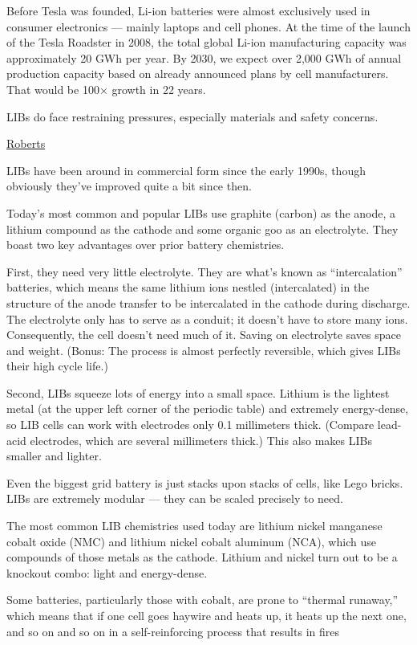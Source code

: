 \documentclass[
]{book}
\begin{document}
Before Tesla was founded, Li-ion batteries were almost exclusively used in consumer electronics --- mainly laptops and cell phones. At the time of the launch of the Tesla Roadster in 2008, the total global Li-ion manufacturing capacity was approximately 20 GWh per year. By 2030, we expect over 2,000 GWh of annual production capacity based on already announced plans by cell manufacturers.
That would be 100× growth in 22 years.

LIBs do face restraining pressures, especially materials and safety concerns.

\href{https://www.canarymedia.com/articles/why-lithium-ion-batteries-are-so-important/}{Roberts}

LIBs have been around in commercial form since the early 1990s, though obviously they've improved quite a bit since then.

Today's most common and popular LIBs use graphite (carbon) as the anode, a lithium compound as the cathode and some organic goo as an electrolyte. They boast two key advantages over prior battery chemistries.

First, they need very little electrolyte. They are what's known as ``intercalation'' batteries, which means the same lithium ions nestled (intercalated) in the structure of the anode transfer to be intercalated in the cathode during discharge. The electrolyte only has to serve as a conduit; it doesn't have to store many ions. Consequently, the cell doesn't need much of it. Saving on electrolyte saves space and weight. (Bonus: The process is almost perfectly reversible, which gives LIBs their high cycle life.)

Second, LIBs squeeze lots of energy into a small space. Lithium is the lightest metal (at the upper left corner of the periodic table) and extremely energy-dense, so LIB cells can work with electrodes only 0.1 millimeters thick. (Compare lead-acid electrodes, which are several millimeters thick.) This also makes LIBs smaller and lighter.

Even the biggest grid battery is just stacks upon stacks of cells, like Lego bricks. LIBs are extremely modular --- they can be scaled precisely to need.

The most common LIB chemistries used today are lithium nickel manganese cobalt oxide (NMC) and lithium nickel cobalt aluminum (NCA), which use compounds of those metals as the cathode. Lithium and nickel turn out to be a knockout combo: light and energy-dense.

Some batteries, particularly those with cobalt, are prone to ``thermal runaway,'' which means that if one cell goes haywire and heats up, it heats up the next one, and so on and so on in a self-reinforcing process that results in fires
\end{document}
